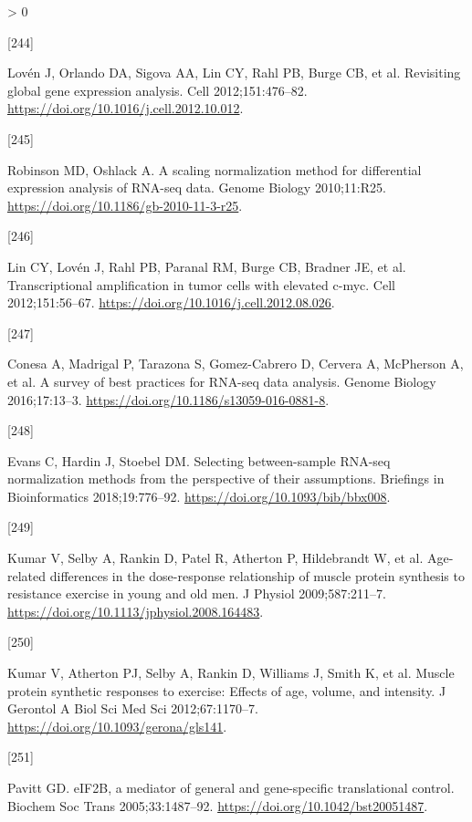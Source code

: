 \documentclass[twoside,10pt]{gihclass} %
\newlength{\cslhangindent}
\newlength{\csllabelwidth}
\newenvironment{CSLReferences}[3] %
 {%
  \setlength{\parindent}{0pt}
  \ifodd #1 \everypar{\setlength{\hangindent}{\cslhangindent}}\ignorespaces\fi
  \ifnum #2 > 0
  \setlength{\parskip}{#2\baselineskip}
  \fi
 }%
 {}
\newcommand{\CSLLeftMargin}[1]{\parbox[t]{\maxof{\widthof{#1}}{\csllabelwidth}}{#1}}
\newcommand{\CSLRightInline}[1]{\parbox[t]{\linewidth}{#1}}
\begin{document}
\begin{CSLReferences}{0}{0}
\leavevmode\hypertarget{ref-RN2359}{}%
\CSLLeftMargin{{[}244{]} }
\CSLRightInline{Lovén J, Orlando DA, Sigova AA, Lin CY, Rahl PB, Burge CB, et al. Revisiting global gene expression analysis. Cell 2012;151:476--82. \url{https://doi.org/10.1016/j.cell.2012.10.012}.}

\leavevmode\hypertarget{ref-RN2414}{}%
\CSLLeftMargin{{[}245{]} }
\CSLRightInline{Robinson MD, Oshlack A. A scaling normalization method for differential expression analysis of RNA-seq data. Genome Biology 2010;11:R25. \url{https://doi.org/10.1186/gb-2010-11-3-r25}.}

\leavevmode\hypertarget{ref-RN2430}{}%
\CSLLeftMargin{{[}246{]} }
\CSLRightInline{Lin CY, Lovén J, Rahl PB, Paranal RM, Burge CB, Bradner JE, et al. Transcriptional amplification in tumor cells with elevated c-myc. Cell 2012;151:56--67. \url{https://doi.org/10.1016/j.cell.2012.08.026}.}

\leavevmode\hypertarget{ref-RN2426}{}%
\CSLLeftMargin{{[}247{]} }
\CSLRightInline{Conesa A, Madrigal P, Tarazona S, Gomez-Cabrero D, Cervera A, McPherson A, et al. A survey of best practices for RNA-seq data analysis. Genome Biology 2016;17:13--3. \url{https://doi.org/10.1186/s13059-016-0881-8}.}

\leavevmode\hypertarget{ref-RN2878}{}%
\CSLLeftMargin{{[}248{]} }
\CSLRightInline{Evans C, Hardin J, Stoebel DM. Selecting between-sample RNA-seq normalization methods from the perspective of their assumptions. Briefings in Bioinformatics 2018;19:776--92. \url{https://doi.org/10.1093/bib/bbx008}.}

\leavevmode\hypertarget{ref-RN2720}{}%
\CSLLeftMargin{{[}249{]} }
\CSLRightInline{Kumar V, Selby A, Rankin D, Patel R, Atherton P, Hildebrandt W, et al. Age-related differences in the dose-response relationship of muscle protein synthesis to resistance exercise in young and old men. J Physiol 2009;587:211--7. \url{https://doi.org/10.1113/jphysiol.2008.164483}.}

\leavevmode\hypertarget{ref-RN2716}{}%
\CSLLeftMargin{{[}250{]} }
\CSLRightInline{Kumar V, Atherton PJ, Selby A, Rankin D, Williams J, Smith K, et al. Muscle protein synthetic responses to exercise: Effects of age, volume, and intensity. J Gerontol A Biol Sci Med Sci 2012;67:1170--7. \url{https://doi.org/10.1093/gerona/gls141}.}

\leavevmode\hypertarget{ref-RN2853}{}%
\CSLLeftMargin{{[}251{]} }
\CSLRightInline{Pavitt GD. eIF2B, a mediator of general and gene-specific translational control. Biochem Soc Trans 2005;33:1487--92. \url{https://doi.org/10.1042/bst20051487}.}


\end{CSLReferences}
\end{document}

